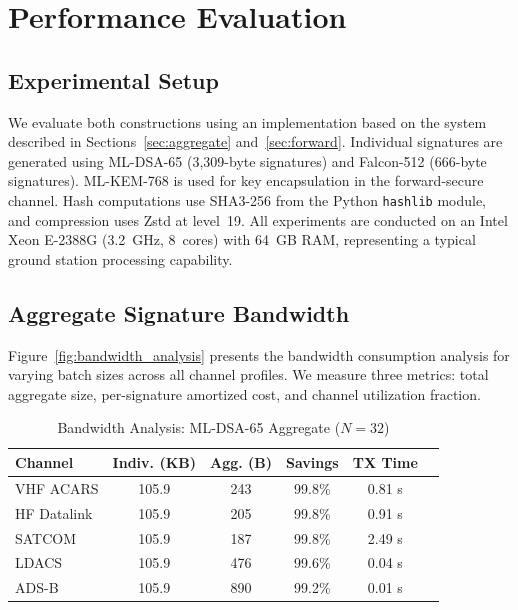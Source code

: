 \documentclass[conference,10pt]{IEEEtran}
\begin{document}
\section{Performance Evaluation}
\label{sec:evaluation}

\subsection{Experimental Setup}

We evaluate both constructions using an implementation based on the system described in Sections~\ref{sec:aggregate} and~\ref{sec:forward}. Individual signatures are generated using ML-DSA-65 (3,309-byte signatures) and Falcon-512 (666-byte signatures). ML-KEM-768 is used for key encapsulation in the forward-secure channel. Hash computations use SHA3-256 from the Python \texttt{hashlib} module, and compression uses Zstd at level~19. All experiments are conducted on an Intel Xeon E-2388G (3.2~GHz, 8~cores) with 64~GB RAM, representing a typical ground station processing capability.

\subsection{Aggregate Signature Bandwidth}

Figure~\ref{fig:bandwidth_analysis} presents the bandwidth consumption analysis for varying batch sizes across all channel profiles. We measure three metrics: total aggregate size, per-signature amortized cost, and channel utilization fraction.

\begin{table}[t]
\centering
\caption{Bandwidth Analysis: ML-DSA-65 Aggregate ($N=32$)}
\label{tab:bandwidth_mldsa}
\begin{tabular}{lccccc}
\toprule
\textbf{Channel} & \textbf{Indiv. (KB)} & \textbf{Agg. (B)} & \textbf{Savings} & \textbf{TX Time} \\
\midrule
VHF ACARS & 105.9 & 243 & 99.8\% & 0.81 s \\
HF Datalink & 105.9 & 205 & 99.8\% & 0.91 s \\
SATCOM & 105.9 & 187 & 99.8\% & 2.49 s \\
LDACS & 105.9 & 476 & 99.6\% & 0.04 s \\
ADS-B & 105.9 & 890 & 99.2\% & 0.01 s \\
\bottomrule
\end{tabular}
\end{table}
\end{document}
